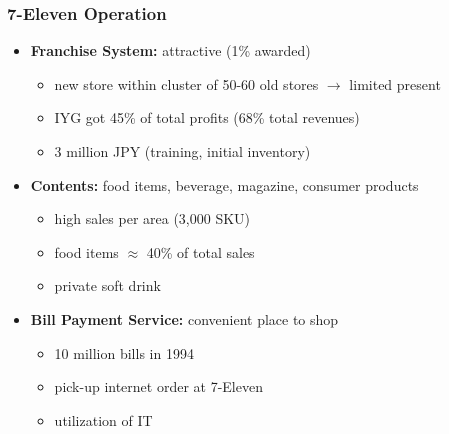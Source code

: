 \documentclass[10pt,handout,notes=show]{beamer}
\begin{document}
\begin{frame}
  \frametitle{7-Eleven Operation}


  \begin{itemize}
    \item \textbf{Franchise System:} attractive (1\% awarded)
    \begin{itemize}
      \item<2-> new store \alert{within cluster of 50-60} old stores $\rightarrow$ limited present
      \item<2-> IYG got 45\% of total profits (68\% total revenues)
      \item<2-> 3 million JPY (training, initial inventory) \NextHalfLine
    \end{itemize}
    \item \textbf{Contents:} food items, beverage, magazine, consumer products
    \begin{itemize}
      \item<3-> high sales per area (3,000 SKU)
      \item<3-> \alert{food items} $\approx$ 40\% of total sales
      \item<3-> private soft drink \NextHalfLine
    \end{itemize}
    \item \textbf{Bill Payment Service:} convenient place to shop
    \begin{itemize}
      \item<4-> 10 million bills in 1994
      \item<4-> pick-up internet order at 7-Eleven
      \item<4-> utilization of IT
    \end{itemize}
  \end{itemize}


\end{frame}
%
\end{document}

